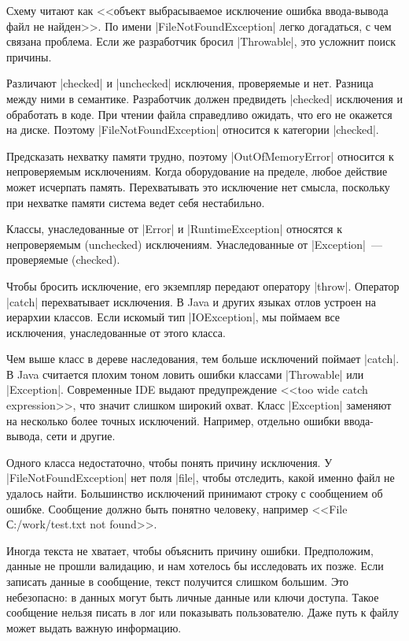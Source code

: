 Схему читают как <<объект \arr выбрасываемое \arr исключение \arr ошибка
ввода-вывода \arr файл не найден>>. По имени \spverb|FileNotFoundException|
легко догадаться, с чем связана проблема. Если же разработчик бросил
\spverb|Throwable|, это усложнит поиск причины.

Различают \spverb|checked| и \spverb|unchecked| исключения, проверяемые и
нет. Разница между ними в семантике. Разработчик должен предвидеть
\spverb|checked| исключения и обработать в коде. При чтении файла справедливо
ожидать, что его не окажется на диске. Поэтому \spverb|FileNotFoundException|
относится к категории \spverb|checked|.

Предсказать нехватку памяти трудно, поэтому \spverb|OutOfMemoryError| относится
к непроверяемым исключениям. Когда оборудование на пределе, любое действие может
исчерпать память. Перехватывать это исключение нет смысла, поскольку при
нехватке памяти система ведет себя нестабильно.

Классы, унаследованные от \spverb|Error| и \spverb|RuntimeException| относятся к
непроверяемым (unchecked) исключениям. Унаследованные от \spverb|Exception|~---
проверяемые (checked).

Чтобы бросить исключение, его экземпляр передают оператору
\spverb|throw|. Оператор \spverb|catch| перехватывает исключения. В Java и
других языках отлов устроен на иерархии классов. Если искомый тип
\spverb|IOException|, мы поймаем все исключения, унаследованные от этого класса.

Чем выше класс в дереве наследования, тем больше исключений поймает
\spverb|catch|. В Java считается плохим тоном ловить ошибки классами
\spverb|Throwable| или \spverb|Exception|. Современные IDE выдают предупреждение
<<too wide catch expression>>, что значит слишком широкий охват. Класс
\spverb|Exception| заменяют на несколько более точных исключений. Например,
отдельно ошибки ввода-вывода, сети и другие.

Одного класса недостаточно, чтобы понять причину исключения. У
\spverb|FileNotFoundException| нет поля \spverb|file|, чтобы отследить, какой
именно файл не удалось найти. Большинство исключений принимают строку с
сообщением об ошибке. Сообщение должно быть понятно человеку, например <<File
С:/work/test.txt not found>>.

Иногда текста не хватает, чтобы объяснить причину ошибки. Предположим, данные не
прошли валидацию, и нам хотелось бы исследовать их позже. Если записать данные в
сообщение, текст получится слишком большим. Это небезопасно: в данных могут быть
личные данные или ключи доступа. Такое сообщение нельзя писать в лог или
показывать пользователю. Даже путь к файлу может выдать важную информацию.

